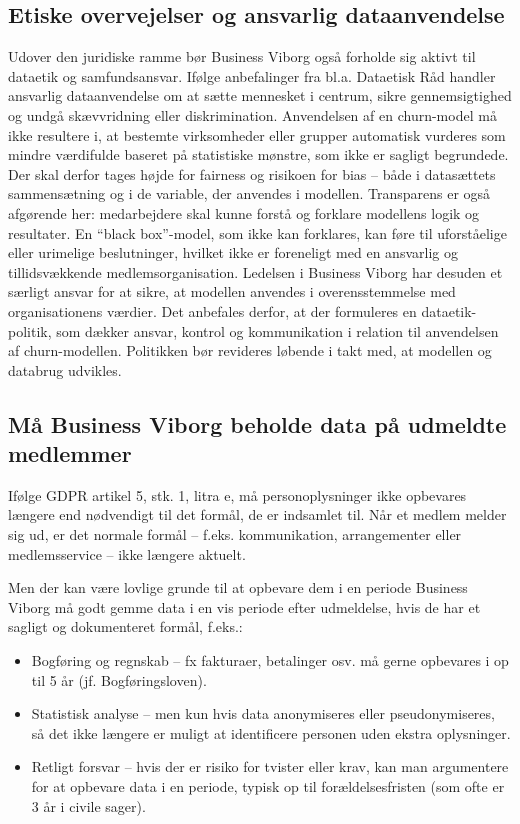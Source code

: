 \documentclass[
  11pt,
  letterpaper,
  DIV=11,
  numbers=noendperiod]{scrartcl}
\providecommand{\tightlist}{%
  \setlength{\itemsep}{0pt}\setlength{\parskip}{0pt}}\usepackage{longtable,booktabs,array}
\begin{document}
\subsection{Etiske overvejelser og ansvarlig
dataanvendelse}\label{etiske-overvejelser-og-ansvarlig-dataanvendelse}

Udover den juridiske ramme bør Business Viborg også forholde sig aktivt
til dataetik og samfundsansvar. Ifølge anbefalinger fra bl.a. Dataetisk
Råd handler ansvarlig dataanvendelse om at sætte mennesket i centrum,
sikre gennemsigtighed og undgå skævvridning eller diskrimination.
Anvendelsen af en churn-model må ikke resultere i, at bestemte
virksomheder eller grupper automatisk vurderes som mindre værdifulde
baseret på statistiske mønstre, som ikke er sagligt begrundede. Der skal
derfor tages højde for fairness og risikoen for bias -- både i
datasættets sammensætning og i de variable, der anvendes i modellen.
Transparens er også afgørende her: medarbejdere skal kunne forstå og
forklare modellens logik og resultater. En ``black box''-model, som ikke
kan forklares, kan føre til uforståelige eller urimelige beslutninger,
hvilket ikke er foreneligt med en ansvarlig og tillidsvækkende
medlemsorganisation. Ledelsen i Business Viborg har desuden et særligt
ansvar for at sikre, at modellen anvendes i overensstemmelse med
organisationens værdier. Det anbefales derfor, at der formuleres en
dataetik-politik, som dækker ansvar, kontrol og kommunikation i relation
til anvendelsen af churn-modellen. Politikken bør revideres løbende i
takt med, at modellen og databrug udvikles.

\subsection{Må Business Viborg beholde data på udmeldte
medlemmer}\label{muxe5-business-viborg-beholde-data-puxe5-udmeldte-medlemmer}

Ifølge GDPR artikel 5, stk. 1, litra e, må personoplysninger ikke
opbevares længere end nødvendigt til det formål, de er indsamlet til.
Når et medlem melder sig ud, er det normale formål -- f.eks.
kommunikation, arrangementer eller medlemsservice -- ikke længere
aktuelt.

Men der kan være lovlige grunde til at opbevare dem i en periode
Business Viborg må godt gemme data i en vis periode efter udmeldelse,
hvis de har et sagligt og dokumenteret formål, f.eks.:

\begin{itemize}
\tightlist
\item
  Bogføring og regnskab -- fx fakturaer, betalinger osv. må gerne
  opbevares i op til 5 år (jf. Bogføringsloven).
\item
  Statistisk analyse -- men kun hvis data anonymiseres eller
  pseudonymiseres, så det ikke længere er muligt at identificere
  personen uden ekstra oplysninger.
\item
  Retligt forsvar -- hvis der er risiko for tvister eller krav, kan man
  argumentere for at opbevare data i en periode, typisk op til
  forældelsesfristen (som ofte er 3 år i civile sager).
\end{itemize}
\end{document}
